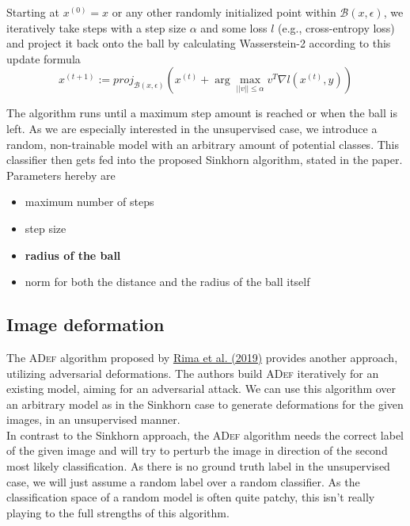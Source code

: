 \documentclass[]{article}
\begin{document}
Starting at $x^{(0)}=x$ or any other randomly initialized point within $\mathcal{B}(x,\epsilon)$, we iteratively take steps with a step size $\alpha$ and some loss $l$ (e.g., cross-entropy loss) and project it back onto the ball by calculating Wasserstein-2 according to this update formula
\begin{equation}
	x^{(t+1)} := proj_{\mathcal{B}(x,\epsilon)} (x^{(t)} + \arg \max_{||v||\leq\alpha}v^T\nabla l(x^{(t)},y))
\end{equation}

The algorithm runs until a maximum step amount is reached or when the ball is left. As we are especially interested in the unsupervised case, we introduce a random, non-trainable model with an arbitrary amount of potential classes. This classifier then gets fed into the proposed Sinkhorn algorithm, stated in the paper. \\

Parameters hereby are 
\begin{itemize}
	\item maximum number of steps
	\item step size
	\item \textbf{radius of the ball}
	\item norm for both the distance and the radius of the ball itself
\end{itemize}




\subsection{Image deformation}
The \textsc{ADef} algorithm proposed by \href{https://openreview.net/pdf?id=Hk4dFjR5K7}{Rima et al. (2019)} provides another approach, utilizing adversarial deformations. The authors build \textsc{ADef} iteratively for an existing model, aiming for an adversarial attack. We can use this algorithm over an arbitrary model as in the Sinkhorn case to generate deformations for the given images, in an unsupervised manner. \\

In contrast to the Sinkhorn approach, the \textsc{ADef} algorithm needs the correct label of the given image and will try to perturb the image in direction of the second most likely classification. As there is no ground truth label in the unsupervised case, we will just assume a random label over a random classifier. As the classification space of a random model is often quite patchy, this isn't really playing to the full strengths of this algorithm.\\
\end{document}

